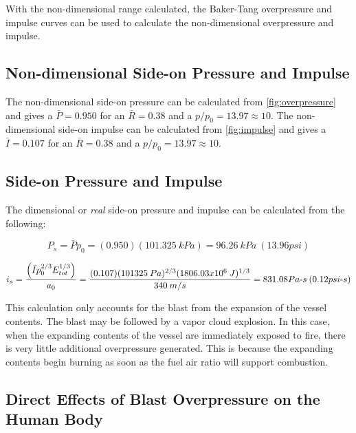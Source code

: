 \documentclass[10pt,parskip=half,
toc=sectionentrywithdots,
bibliography=totocnumbered,
captions=tableheading,numbers=noendperiod]{scrartcl}
\begin{document}
With the non-dimensional range calculated, the Baker-Tang overpressure
and impulse curves can be used to calculate the non-dimensional
overpressure and impulse.

\hypertarget{non-dimensional-side-on-pressure-and-impulse}{%
\subsection{Non-dimensional Side-on Pressure and
Impulse}\label{non-dimensional-side-on-pressure-and-impulse}}

The non-dimensional side-on pressure can be calculated from
\cref{fig:overpressure} and gives a \(\bar{P} = 0.950\) for an
\(\bar{R}=0.38\) and a \(p/p_0 = 13.97 \approx 10\). The non-dimensional
side-on impulse can be calculated from \cref{fig:impulse} and gives a
\(\bar{I} = 0.107\) for an \(\bar{R}=0.38\) and a
\(p/p_0 = 13.97 \approx 10\).

\hypertarget{side-on-pressure-and-impulse}{%
\subsection{Side-on Pressure and
Impulse}\label{side-on-pressure-and-impulse}}

The dimensional or \emph{real} side-on pressure and impulse can be
calculated from the following:

\begin{equation}P_s = \bar{P}p_0 = (0.950)(101.325\:kPa) = 96.26\:kPa \:(13.96psi)\end{equation}

\begin{equation}i_s = \frac{\left(\bar I p_0^{2/3}E_{tot}^{1/3}\right)}{a_0}=\frac{(0.107)(101325\:Pa)^{2/3}(1806.03x10^6\:J)^{1/3}}{340\:m/s}= 831.08Pa {\text -} s\:(0.12psi{\text -}s)\end{equation}

This calculation only accounts for the blast from the expansion of the
vessel contents. The blast may be followed by a vapor cloud explosion.
In this case, when the expanding contents of the vessel are immediately
exposed to fire, there is very little additional overpressure generated.
This is because the expanding contents begin burning as soon as the fuel
air ratio will support combustion.

\hypertarget{direct-effects-of-blast-overpressure-on-the-human-body}{%
\subsection{Direct Effects of Blast Overpressure on the Human
Body}\label{direct-effects-of-blast-overpressure-on-the-human-body}}
\end{document}
